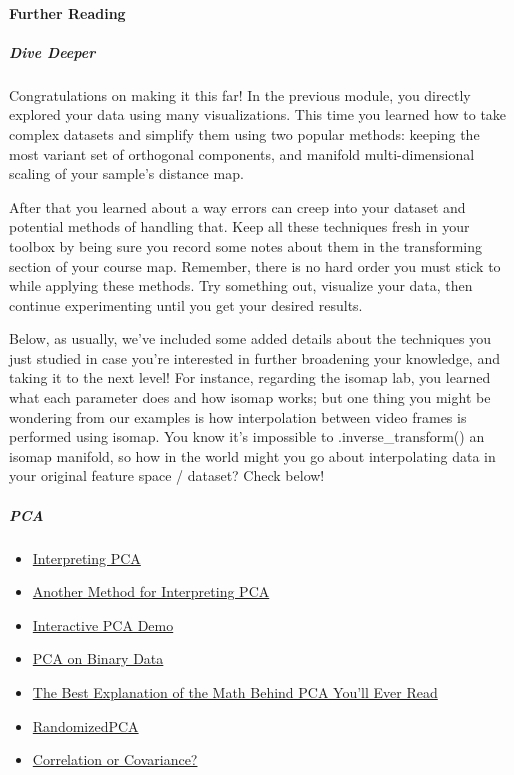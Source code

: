 \documentclass[11pt]{article}
\providecommand{\tightlist}{%
      \setlength{\itemsep}{0pt}\setlength{\parskip}{0pt}}
\begin{document}
\hypertarget{further-reading}{%
\paragraph{Further Reading}\label{further-reading}}

\hypertarget{dive-deeper}{%
\subparagraph{Dive Deeper}\label{dive-deeper}}

Congratulations on making it this far! In the previous module, you
directly explored your data using many visualizations. This time you
learned how to take complex datasets and simplify them using two popular
methods: keeping the most variant set of orthogonal components, and
manifold multi-dimensional scaling of your sample's distance map.

After that you learned about a way errors can creep into your dataset
and potential methods of handling that. Keep all these techniques fresh
in your toolbox by being sure you record some notes about them in the
transforming section of your course map. Remember, there is no hard
order you must stick to while applying these methods. Try something out,
visualize your data, then continue experimenting until you get your
desired results.

Below, as usually, we've included some added details about the
techniques you just studied in case you're interested in further
broadening your knowledge, and taking it to the next level! For
instance, regarding the isomap lab, you learned what each parameter does
and how isomap works; but one thing you might be wondering from our
examples is how interpolation between video frames is performed using
isomap. You know it's impossible to .inverse\_transform() an isomap
manifold, so how in the world might you go about interpolating data in
your original feature space / dataset? Check below!

\hypertarget{pca}{%
\subparagraph{PCA}\label{pca}}

\begin{itemize}
\tightlist
\item
  \href{https://onlinecourses.science.psu.edu/stat505/node/54}{Interpreting
  PCA}
\item
  \href{http://www.stat.cmu.edu/~cshalizi/350/lectures/10/lecture-10.pdf}{Another
  Method for Interpreting PCA}
\item
  \href{http://setosa.io/ev/principal-component-analysis/}{Interactive
  PCA Demo}
\item
  \href{https://stats.stackexchange.com/questions/103953/pca-on-binary-data}{PCA
  on Binary Data}
\item
  \href{http://www.cs.otago.ac.nz/cosc453/student_tutorials/principal_components.pdf}{The
  Best Explanation of the Math Behind PCA You'll Ever Read}
\item
  \href{http://scikit-learn.org/stable/modules/generated/sklearn.decomposition.RandomizedPCA.html}{RandomizedPCA}
\item
  \href{https://stats.stackexchange.com/questions/62677/pca-on-correlation-or-covariance-does-pca-on-correlation-ever-make-sense\#62699}{Correlation
  or Covariance?}
\end{itemize}
\end{document}
